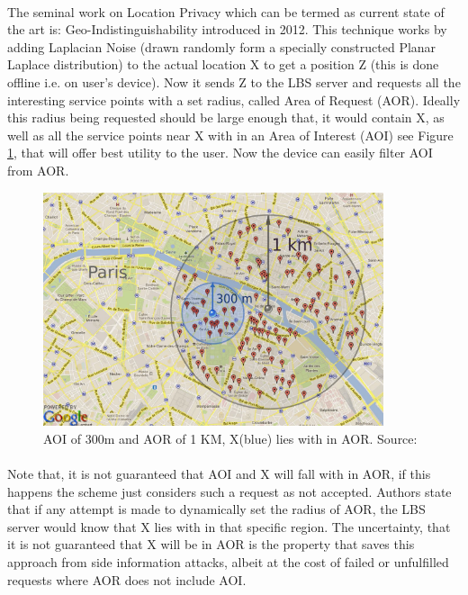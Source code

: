 \documentclass[12pt]{report}
\theoremstyle{named}
\begin{document}
\paragraph{}
The seminal work on Location Privacy which can be termed as current state of the art is: Geo-Indistinguishability \cite{andres2013geo} introduced in 2012. This technique works by adding Laplacian Noise (drawn randomly form a specially constructed Planar Laplace distribution) to the actual location X to get a position Z (this is done offline i.e. on user's device). Now it sends Z to the LBS server and requests all the interesting service points with a set radius, called Area of Request (AOR). Ideally this radius being requested should be large enough that, it would contain X, as well as all the service points near X with in an Area of Interest (AOI) see Figure \ref{fig:AOIvsAOR}, that will offer best utility to the user. Now the device can easily filter AOI from AOR.
\begin{figure}[ht]
\centering
        \includegraphics[width=100mm,scale=1]{Images/AOIvsAOR.PNG}
    \caption{AOI of 300m and AOR of 1 KM, X(blue) lies with in AOR. Source:\cite{andres2013geo}}
    \label{fig:AOIvsAOR}
\end{figure}

\paragraph{}
Note that, it is not guaranteed that  AOI and X will fall with in AOR, if this happens the scheme just considers such a request as not accepted. Authors state that if any attempt is made to dynamically set the radius of AOR, the LBS server would know that X lies with in that specific region. The uncertainty, that it is not guaranteed that X will be in AOR is the property that saves this approach from side information attacks, albeit at the cost of failed or unfulfilled requests where AOR does not include AOI.
\end{document}

